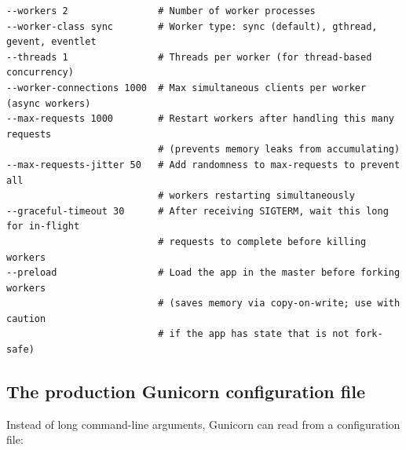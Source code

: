 \begin{outputbox}[short]
\begin{Verbatim}[fontsize=\codesize, breaklines, breakanywhere, breaksymbolleft={\tiny\textcolor{muted}{$\hookrightarrow$}}]
--workers 2                # Number of worker processes
--worker-class sync        # Worker type: sync (default), gthread, gevent, eventlet
--threads 1                # Threads per worker (for thread-based concurrency)
--worker-connections 1000  # Max simultaneous clients per worker (async workers)
--max-requests 1000        # Restart workers after handling this many requests
                           # (prevents memory leaks from accumulating)
--max-requests-jitter 50   # Add randomness to max-requests to prevent all
                           # workers restarting simultaneously
--graceful-timeout 30      # After receiving SIGTERM, wait this long for in-flight
                           # requests to complete before killing workers
--preload                  # Load the app in the master before forking workers
                           # (saves memory via copy-on-write; use with caution
                           # if the app has state that is not fork-safe)
\end{Verbatim}
\end{outputbox}

\subsection*{The production Gunicorn configuration file}\label{24-process-startup:the-production-gunicorn-configuration-file}

Instead of long command-line arguments, Gunicorn can read from a configuration file:

